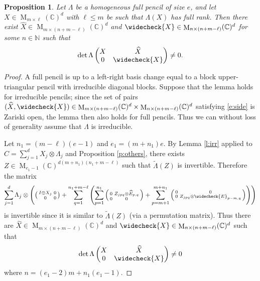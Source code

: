 \documentclass[12pt,a4paper]{amsart}
\DeclareMathOperator{\opm}{M}
\newcommand{\N}{\mathbb{N}}
\newcommand{\C}{\mathbb{C}}
\newcommand*{\mat}[1]{\opm_{#1}(\C)}
\newtheorem{prop}[thm]{Proposition}
\theoremstyle{definition}
\theoremstyle{remark}
\numberwithin{equation}{section}
\begin{document}
\begin{prop}\label{p:side}
Let $\Lambda$ be a homogeneous full pencil of size $e$, and let $X\in\mat{m\times \ell}^d$ with $\ell\le m$ be such that $\Lambda(X)$ has full rank. Then there exist $\widehat{X}\in \mat{m\times (n+m-\ell)}^d$ and $\widecheck{X}\in \mat{n\times (n+m-\ell)}^d$ for some $n\in\N$ such that
\begin{equation}\label{e:side}
\det \Lambda
\begin{pmatrix}
X & \widehat{X} \\ 0 & \widecheck{X}
\end{pmatrix}
\neq0.
\end{equation}
\end{prop}

\begin{proof}
A full pencil is up to a left-right basis change equal to a block upper-triangular pencil with irreducible diagonal blocks. Suppose that the lemma holds for irreducible pencils; since the set of pairs
$(\widehat{X},\widecheck{X})\in \mat{m\times (n+m-\ell)}^d\times \mat{n\times (n+m-\ell)}^d$ satisfying \eqref{e:side} is Zariski open, the lemma then also holds for full pencils. Thus we can without loss of generality assume that $\Lambda$ is irreducible.

Let $n_1=(m-\ell)(e-1)$ and $e_1=(m+n_1)e$. By Lemma \ref{l:irr} applied to $C=\sum_{j=1}^d X_j\otimes \Lambda_j$ and Proposition \ref{p:others}, there exists
$Z \in\mat{e_1-1}^{d(m+n_1)(n_1+m-\ell)}$ such that $\widetilde{\Lambda}(Z)$ is invertible. Therefore the matrix
$$
\sum_{j=1}^d\Lambda_j\otimes\left(
\left(\begin{smallmatrix}I\otimes X_j & 0 \\ 0 & 0\end{smallmatrix}\right)
+\sum_{q=1}^{n_1+m-\ell}\left(\sum_{p=1}^{n_1}
\left(\begin{smallmatrix}
0 & Z_{jpq}\otimes \widehat{E}_{p,q} \\ 0 & 0
\end{smallmatrix}\right)
+\sum_{p=m+1}^{m+n_1}
\left(\begin{smallmatrix}
0 & 0 \\ 0 & Z_{jpq}\otimes \widecheck{E}_{p-m,q}
\end{smallmatrix}\right)
\right)\right)
$$
is invertible since it is similar to $\widetilde{\Lambda}(Z)$ (via a permutation matrix).
Thus there are $\widehat{X}\in \mat{m\times (n+m-\ell)}^d$ and $\widecheck{X}\in \mat{n\times (n+m-\ell)}^d$ such that
$$\det \Lambda
\begin{pmatrix}
	X & \widehat{X} \\ 0 & \widecheck{X}
\end{pmatrix}
\neq0$$
where $n=(e_1-2)m+n_1(e_1-1)$. 
\end{proof}
\end{document}
